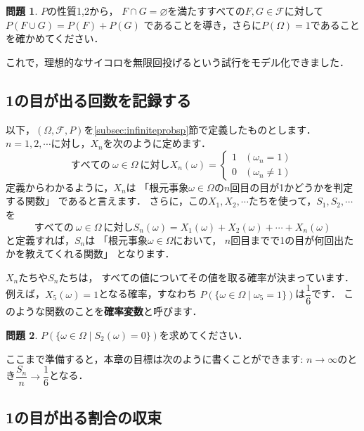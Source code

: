 \documentclass[./main]{subfiles} %
\theoremstyle{definition}
\newtheorem{hamadadefi}{定義}[section]
\newtheorem{hamadaqst}[hamadadefi]{問題}
\begin{document}
\begin{hamadaqst}\label{checkofadditivity}
$P$の性質1,2から，
$F\cap G=\varnothing$を満たすすべての$F,G\in\mathcal{F}$に対して
$P(F\cup G)=P(F)+P(G)$
であることを導き，さらに$P(\Omega)=1$であることを確かめてください．
\end{hamadaqst}

これで，理想的なサイコロを無限回投げるという試行をモデル化できました．


\subsection{1の目が出る回数を記録する}\label{randomvariable}

以下，$(\Omega,\mathcal{F},P)$を\ref{subsec:infiniteprobsp}節で定義したものとします．
$n=1,2,\cdots$に対し，$X_n$を次のように定めます．
\[ すべての\ \omega\in\Omega\ に対しX_n(\omega)=
\begin{cases}1 & (\omega_n=1) \\ 0 & (\omega_n\neq1)\end{cases} \]
定義からわかるように，$X_n$は
「根元事象$\omega\in\Omega$の$n$回目の目が1かどうかを判定する関数」
であると言えます．
さらに，この$X_1,X_2,\cdots$たちを使って，$S_1,S_2,\cdots$を
\[ すべての\ \omega\in\Omega\ に対し
S_n(\omega)=X_1(\omega)+X_2(\omega)+\cdots+X_n(\omega) \]
と定義すれば，$S_n$は
「根元事象$\omega\in\Omega$において，
$n$回目までで1の目が何回出たかを教えてくれる関数」
となります．

$X_n$たちや$S_n$たちは，
すべての値についてその値を取る確率が決まっています．
例えば，$X_5(\omega)=1$となる確率，すなわち
$P(\{\omega\in\Omega\mid\omega_5=1\})$は$\dfrac{1}{6}$です．
このような関数のことを\textbf{確率変数}と呼びます．

\begin{hamadaqst}\label{checkofrandomvariable}
$P(\{\omega\in\Omega\mid S_2(\omega)=0\})$を求めてください．
\end{hamadaqst}

ここまで準備すると，本章の目標は次のように書くことができます:
$n\to\infty$のとき$\dfrac{S_n}{n}\to\dfrac{1}{6}$となる．

\subsection{1の目が出る割合の収束}\label{subsec:LOLN}
\end{document}
